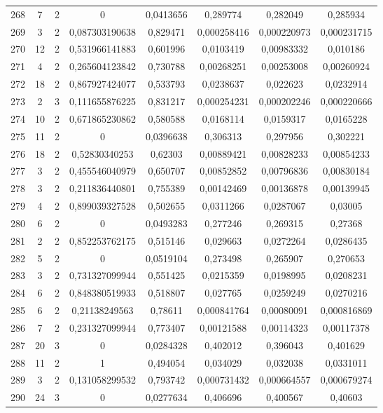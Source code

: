 \begin{longtable}{|c|c|c|c|c|c|c|c|}
268 & 7 & 2 & 0 & 0,0413656 & 0,289774 & 0,282049 & 0,285934  \\
269 & 3 & 2 & 0,087303190638 & 0,829471 & 0,000258416 & 0,000220973 & 0,000231715  \\
270 & 12 & 2 & 0,531966141883 & 0,601996 & 0,0103419 & 0,00983332 & 0,010186  \\
271 & 4 & 2 & 0,265604123842 & 0,730788 & 0,00268251 & 0,00253008 & 0,00260924  \\
272 & 18 & 2 & 0,867927424077 & 0,533793 & 0,0238637 & 0,022623 & 0,0232914  \\
273 & 2 & 3 & 0,111655876225 & 0,831217 & 0,000254231 & 0,000202246 & 0,000220666  \\
274 & 10 & 2 & 0,671865230862 & 0,580588 & 0,0168114 & 0,0159317 & 0,0165228  \\
275 & 11 & 2 & 0 & 0,0396638 & 0,306313 & 0,297956 & 0,302221  \\
276 & 18 & 2 & 0,52830340253 & 0,62303 & 0,00889421 & 0,00828233 & 0,00854233  \\
277 & 3 & 2 & 0,455546040979 & 0,650707 & 0,00852852 & 0,00796836 & 0,00830184  \\
278 & 3 & 2 & 0,211836440801 & 0,755389 & 0,00142469 & 0,00136878 & 0,00139945  \\
279 & 4 & 2 & 0,899039327528 & 0,502655 & 0,0311266 & 0,0287067 & 0,03005  \\
280 & 6 & 2 & 0 & 0,0493283 & 0,277246 & 0,269315 & 0,27368  \\
281 & 2 & 2 & 0,852253762175 & 0,515146 & 0,029663 & 0,0272264 & 0,0286435  \\
282 & 5 & 2 & 0 & 0,0519104 & 0,273498 & 0,265907 & 0,270653  \\
283 & 3 & 2 & 0,731327099944 & 0,551425 & 0,0215359 & 0,0198995 & 0,0208231  \\
284 & 6 & 2 & 0,848380519933 & 0,518807 & 0,027765 & 0,0259249 & 0,0270216  \\
285 & 6 & 2 & 0,21138249563 & 0,78611 & 0,000841764 & 0,00080091 & 0,000816869  \\
286 & 7 & 2 & 0,231327099944 & 0,773407 & 0,00121588 & 0,00114323 & 0,00117378  \\
287 & 20 & 3 & 0 & 0,0284328 & 0,402012 & 0,396043 & 0,401629  \\
288 & 11 & 2 & 1 & 0,494054 & 0,034029 & 0,032038 & 0,0331011  \\
289 & 3 & 2 & 0,131058299532 & 0,793742 & 0,000731432 & 0,000664557 & 0,000679274  \\
290 & 24 & 3 & 0 & 0,0277634 & 0,406696 & 0,400567 & 0,40603  \\

\end{longtable}
